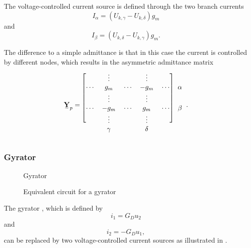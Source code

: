 The voltage-controlled current source  is defined through the two branch currents
\begin{equation}
	I_\alpha = (U_{k,\gamma} - U_{k,\delta}) g_m
\end{equation}
and
\begin{equation}
	I_\beta = (U_{k,\delta} - U_{k,\gamma}) g_m.
\end{equation}

The difference to a simple admittance is that in this case the current is controlled by different nodes, which results in the asymmetric admittance matrix
\begin{equation}
	\mat Y_p = 	
	\begin{blockarray}{cccccc}
		\begin{block}{[ccccc]c}
		 		& \vdots	&			& \vdots	&			& \\
		\cdots	& g_m		& \cdots	& -g_m		& \cdots	& \alpha \\
		 		& \vdots	&			& \vdots	&			& \\
		\cdots	& -g_m		& \cdots	& g_m		& \cdots	& \beta \\
		 		& \vdots	&			& \vdots	&			& \\
		\end{block}
				& \gamma	&			& \delta	&			& 
	\end{blockarray}.
\end{equation}

\subsubsection{Gyrator}

\begin{figure}
	\centering
	
	\caption{Gyrator}
	\label{fig:gyrator_original}
\end{figure}

\begin{figure}
	\centering
	
	\caption{Equivalent circuit for a gyrator}
	\label{fig:gyrator_equivalent}
\end{figure}

The gyrator , which is defined by
\begin{equation}
	i_1 = G_D u_2
\end{equation}
and
\begin{equation}
	i_2 = -G_D u_1,
\end{equation}
can be replaced by two voltage-controlled current sources as illustrated in .

